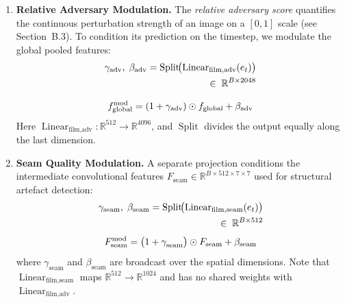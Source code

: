 \begin{enumerate}[leftmargin=*, label=\textbf{\arabic*.}]

\item \textbf{Relative Adversary Modulation.}
The \emph{relative adversary score} quantifies the continuous perturbation
strength of an image on a $[0,1]$ scale (see Section~B.3).  To condition its
prediction on the timestep, we modulate the global pooled features:
\begin{equation}
\begin{aligned}
     \gamma_{\text{adv}},\;\beta_{\text{adv}}
    = \operatorname{Split}\!\bigl(\operatorname{Linear}_{\text{film,adv}}(e_t)\bigr) \\
    \;\in\; \mathbb{R}^{B \times 2048} \notag
    \end{aligned}
\end{equation}    

\begin{equation}
    f_{\text{global}}^{\text{mod}}
    = (1 + \gamma_{\text{adv}}) \odot f_{\text{global}} + \beta_{\text{adv}} \notag
\end{equation}
Here $\operatorname{Linear}_{\text{film,adv}} : \mathbb{R}^{512} \to
\mathbb{R}^{4096}$, and $\operatorname{Split}$ divides the output equally along
the last dimension.

\item \textbf{Seam Quality Modulation.}
A separate projection conditions the intermediate convolutional features
$F_{\text{seam}} \in \mathbb{R}^{B \times 512 \times 7 \times 7}$ used for
structural artefact detection:
\begin{equation}
\begin{aligned}
    \gamma_{\text{seam}},\;\beta_{\text{seam}}
    = \operatorname{Split}\!\bigl(\operatorname{Linear}_{\text{film,seam}}(e_t)\bigr) \\
    \;\in\; \mathbb{R}^{B \times 512} \notag
\end{aligned}
\end{equation}
\begin{equation}
    F_{\text{seam}}^{\text{mod}}
    = \bigl(1 + \gamma_{\text{seam}}^{\phantom{A}}\bigr) \odot F_{\text{seam}}
      + \beta_{\text{seam}} \notag
\end{equation}
where $\gamma_{\text{seam}}$ and $\beta_{\text{seam}}$ are broadcast over the
spatial dimensions.  Note that $\operatorname{Linear}_{\text{film,seam}}$ maps
$\mathbb{R}^{512} \to \mathbb{R}^{1024}$ and has no shared weights with
$\operatorname{Linear}_{\text{film,adv}}$.

\end{enumerate}

